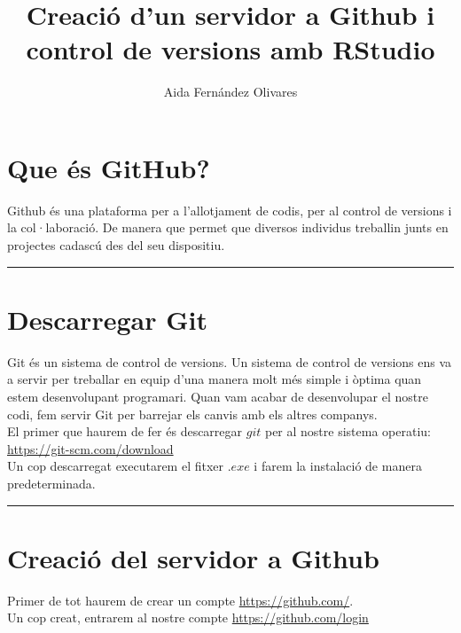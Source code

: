 \documentclass[9pt,a4paper]{article}
\begin{document}
\title{Creació d'un servidor a Github i control de versions amb RStudio}
\author[]{Aida Fernández Olivares}
\date{}

\maketitle

\section{Que és GitHub?}
Github és una plataforma per a l'allotjament de codis, per al control de versions i la col·laboració. De manera que permet que diversos individus treballin junts en projectes cadascú des del seu dispositiu.

\noindent\rule{\textwidth}{0.5pt}

\section{Descarregar Git}
Git és un sistema de control de versions. Un sistema de control de versions ens va a servir per treballar en equip d'una manera molt més simple i òptima quan estem desenvolupant programari. Quan vam acabar de desenvolupar el nostre codi, fem servir Git per barrejar els canvis amb els altres companys.\\

El primer que haurem de fer és descarregar $git$ per al nostre sistema operatiu:\\
\url{https://git-scm.com/download}\\

Un cop descarregat executarem el fitxer $.exe$ i farem la instalació de manera predeterminada.

\noindent\rule{\textwidth}{0.5pt}

\section{Creació del servidor a Github}
Primer de tot haurem de crear un compte \url{https://github.com/}.\\

Un cop creat, entrarem al nostre compte \url{https://github.com/login}\\
\end{document}

